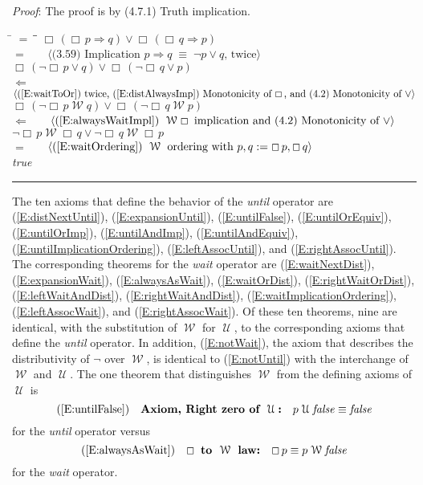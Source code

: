 \documentclass[12pt, fleqn, leqno]{article}
\newcommand{\lgap}{2pt}                             %
\newcommand{\mymathindent}{24pt}                    %
\newcommand{\equivs}{\ensuremath{\;\equiv\;}}       %
\newcommand{\impl}{\ensuremath{\Rightarrow}}        %
\newcommand{\foll}{\ensuremath{\Leftarrow}}         %
\newcommand{\Until}{\;\mathcal{U}\;}
\newcommand{\Wait}{\;\mathcal{W}\;}
\newcommand{\Always}{\Box\,}
\newcommand{\myqed}{\rule[-.23ex]{1.2ex}{2.0ex}}
\newcommand{\myqedtab}{\hspace{384pt}}              %
\newcommand{\Gll} {\langle}                         %
\newcommand{\Ggg} {\rangle}                         %
\newcommand{\Hint}[1]     {\ \ \ $\Gll              \mbox{#1} \Ggg$ }   %
\begin{document}
\emph{Proof}: The proof is by (4.7.1) Truth implication.
\begin{tabbing}
\hspace{\mymathindent} \= $= \;$ \= \myqedtab \= \kill
  \> \> $\Always(\Always p\impl q)\lor \Always(\Always q\impl p)$\\[\lgap]
\> $=$  \>  \Hint{(3.59) Implication $p\impl q \equivs \neg p \lor q$, twice}\\[\lgap]
  \> \> $\Always(\neg \Always p\lor q)\lor \Always(\neg \Always q\lor p)$\\[\lgap]
  \> $\foll$  \>  \Hint{(\ref{E:waitToOr}) twice, (\ref{E:distAlwaysImp}) Monotonicity of $\Always$, and (4.2) Monotonicity of $\lor$}\\[\lgap]
  \> \> $\Always(\neg \Always p\Wait q)\lor \Always(\neg \Always q\Wait p)$\\[\lgap]
  \> $\foll$  \>  \Hint{(\ref{E:alwaysWaitImpl}) $\Wait\Always$ implication and (4.2) Monotonicity of $\lor$}\\[\lgap]
  \> \> $\neg \Always p\Wait \Always q\lor \neg \Always q\Wait \Always p$\\[\lgap]
  \> $=$  \>  \Hint{(\ref{E:waitOrdering}) $\Wait$ ordering with $p,q:=\Always p, \Always q$}\\[\lgap]
  \> \> \textit{true} \quad \myqed
\end{tabbing}

The ten axioms that define the behavior of the \textit{until} operator are (\ref{E:distNextUntil}), (\ref{E:expansionUntil}), (\ref{E:untilFalse}), (\ref{E:untilOrEquiv}), (\ref{E:untilOrImp}), (\ref{E:untilAndImp}), (\ref{E:untilAndEquiv}), (\ref{E:untilImplicationOrdering}), (\ref{E:leftAssocUntil}), and (\ref{E:rightAssocUntil}).
The corresponding theorems for the \textit{wait} operator are (\ref{E:waitNextDist}), (\ref{E:expansionWait}), (\ref{E:alwaysAsWait}), (\ref{E:waitOrDist}), (\ref{E:rightWaitOrDist}), (\ref{E:leftWaitAndDist}), (\ref{E:rightWaitAndDist}), (\ref{E:waitImplicationOrdering}), (\ref{E:leftAssocWait}), and (\ref{E:rightAssocWait}).
Of these ten theorems, nine are identical, with the substitution of $\Wait$ for $\Until$, to the corresponding axioms that define the \textit{until} operator.
In addition, (\ref{E:notWait}), the axiom that describes the distributivity of $\neg$ over $\Wait$, is identical to (\ref{E:notUntil}) with the interchange of $\Wait$ and $\Until$.
The one theorem that distinguishes $\Wait$ from the defining axioms of $\Until$ is
\begin{equation}
(\ref{E:untilFalse})\quad \textbf{Axiom, Right zero of $\Until$:}\quad p \Until \mathit{false} \equiv \mathit{false} \nonumber
\end{equation}
for the \textit{until} operator versus
\begin{equation}
(\ref{E:alwaysAsWait})\quad \textbf{$\Always$ to $\Wait$ law:}\quad \Always p \equiv p \Wait \mathit{false} \nonumber
\end{equation}
for the \textit{wait} operator.
\end{document}
